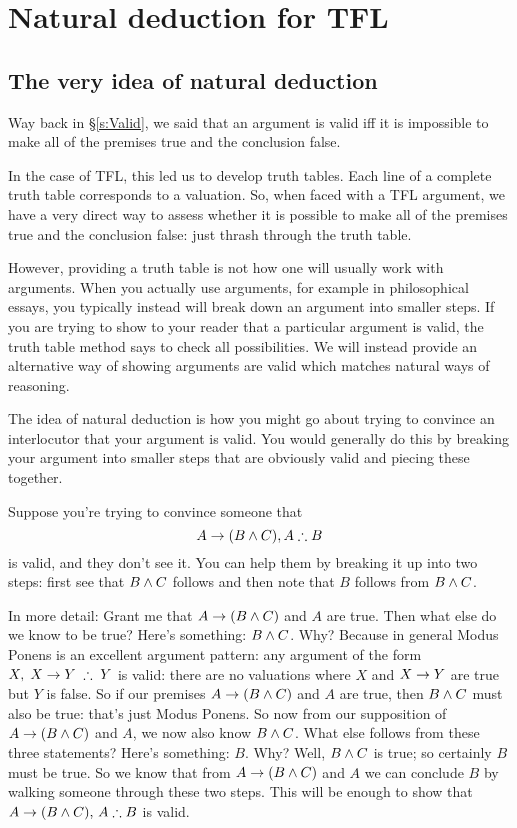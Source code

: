 \part{Natural deduction for TFL}
\label{ch.NDTFL}

\chapter{The very idea of natural deduction}\label{s:NDVeryIdea}

Way back in \S\ref{s:Valid}, we said that an argument is valid iff it is impossible to make all of the premises true and the conclusion false.

In the case of TFL, this led us to develop truth tables. Each line of a complete truth table corresponds to a valuation. So, when faced with a TFL argument, we have a very direct way to assess whether it is possible to make all of the premises true and the conclusion false: just thrash through the truth table.

However, providing a truth table is not how one will usually work with arguments. When you actually use arguments, for example in philosophical essays, you typically instead will break down an argument into smaller steps. If you are trying to show to your reader that a particular argument is valid, the truth table method says to check all possibilities. We will instead provide an alternative way of showing arguments are valid which matches natural ways of reasoning.

The idea of natural deduction is how you might go about trying to convince an interlocutor that your argument is valid. You would generally do this by breaking your argument into smaller steps that are obviously valid and piecing these together.

Suppose you're trying to convince someone that $$A\eif(B\eand C),A\therefore B$$ is valid, and they don't see it. You can help them by breaking it up into two steps: first see that $B\mathbin{\wedge} C$ follows and then note that $B$ follows from $B\mathbin{\wedge} C$.


In more detail:
Grant me that $A\rightarrow (B\mathbin{\wedge} C)$ and $A$ are true. Then what else do we know to be true? Here's something: $B\mathbin{\wedge} C$. Why? Because in general Modus Ponens is an excellent argument pattern: any argument of the form $X,\;X\eif Y\;\therefore\;Y$ is valid: there are no valuations where $X$ and $X\rightarrow Y$ are true but $Y$ is false. So if our premises  $A\rightarrow (B\mathbin{\wedge} C)$ and $A$ are true, then $B\mathbin{\wedge} C$ must also be true: that's just Modus Ponens. So now from our supposition of $A\rightarrow(B\mathbin{\wedge} C)$ and $A$, we now also know $B\mathbin{\wedge} C$. What else follows from these three statements? Here's something: $B$. Why? Well, $B\mathbin{\wedge} C$ is true; so certainly $B$ must be true. So we know that from $A\rightarrow(B\mathbin{\wedge} C)$ and $A$ we can conclude $B$ by walking someone through these two steps. This will be enough to show that $A\eif(B\eand C),\,A\therefore B$ is valid.

